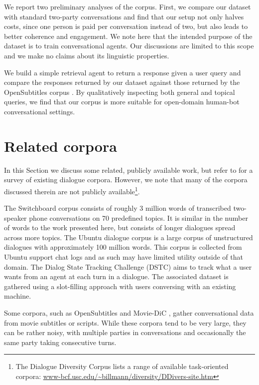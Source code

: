 \documentclass[11pt,a4paper]{article}
\begin{document}
We report two preliminary analyses of the corpus. First, we compare our dataset with standard two-party conversations and find that our setup not only halves costs, since one person is paid per conversation instead of two, but also leads to better coherence and engagement. We note here that the intended purpose of the dataset is to train conversational agents. Our discussions are limited to this scope and we make no claims about its linguistic properties.

We build a simple retrieval agent to return a response given a user query and compare the responses returned by our dataset against those returned by the OpenSubtitles corpus \cite{tiedemann2012parallel}. By qualitatively inspecting both general and topical queries, we find that our corpus is more suitable for open-domain human-bot conversational settings.
 
\section{Related corpora}
In this Section we discuss some related, publicly available work, but refer to \citet{serban2015survey} for a survey of existing dialogue corpora. However, we note that many of the corpora discussed therein are not publicly available\footnote{The Dialogue Diversity Corpus lists a range of available task-oriented corpora: \url{www-bcf.usc.edu/~billmann/diversity/DDivers-site.htm}}.

The Switchboard \cite{godfrey1992switchboard} corpus consists of roughly 3 million words of transcribed two-speaker phone conversations on 70 predefined topics. It is similar in the number of words to the work presented here, but consists of longer dialogues spread across more topics. The Ubuntu dialogue corpus \cite{W15-4640} is a large corpus of unstructured dialogues with approximately 100 million words. This corpus is collected from Ubuntu support chat logs and as such may have limited utility outside of that domain. The Dialog State Tracking Challenge (DSTC) \cite{williams2013dialog} aims to track what a user wants from an agent at each turn in a dialogue. The associated dataset is gathered using a slot-filling approach with users conversing with an existing machine.

Some corpora, such as OpenSubtitles \cite{tiedemann2012parallel} and Movie-DiC \cite{banchs2012movie}, gather conversational data from movie subtitles or scripts. While these corpora tend to be very large, they can be rather noisy, with multiple parties in conversations and occasionally the same party taking consecutive turns.
\end{document}
